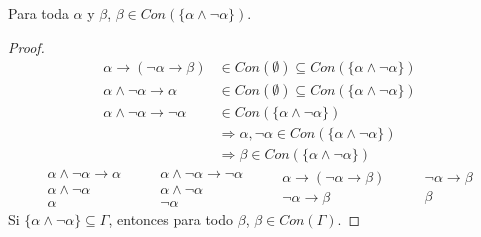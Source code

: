 \begin{prop}
    Para toda $\alpha$ y $\beta$, $\beta\in Con(\{\alpha\land\lnot\alpha\})$.
    \begin{proof}
        \begin{align*}
            \alpha\rightarrow(\lnot\alpha\rightarrow\beta) &\in Con(\emptyset )\subseteq Con(\{\alpha\land\lnot\alpha\})\\
            \alpha\land\lnot\alpha\rightarrow\alpha &\in Con(\emptyset )\subseteq Con(\{\alpha\land\lnot\alpha\}) \\
            \alpha\land \lnot\alpha\rightarrow\lnot\alpha &\in Con(\{\alpha\land\lnot\alpha\})\\
                                                          &\Longrightarrow \alpha,\lnot\alpha\in Con(\{\alpha\land\lnot\alpha\}) \\
                                                          &\Longrightarrow \beta\in Con(\{\alpha\land\lnot\alpha\})
        \end{align*}
        \begin{equation*}
            \begin{array}{c}
                \alpha\land\lnot\alpha\rightarrow\alpha\\
                \alpha\land\lnot\alpha\\
                \hline
                \alpha
            \end{array}\qquad 
            \begin{array}{c}
                \alpha\land\lnot\alpha \rightarrow\lnot\alpha\\
                \alpha\land \lnot\alpha\\
                \hline
                \lnot\alpha
            \end{array}\qquad 
            \begin{array}{c}
                \alpha\rightarrow(\lnot\alpha\rightarrow\beta)\\
                \hline
                \lnot\alpha\rightarrow\beta
            \end{array}\qquad 
            \begin{array}{c}
                \lnot\alpha\rightarrow\beta \\
                \hline
                \beta
            \end{array}
        \end{equation*}
        Si $\{\alpha\land\lnot\alpha\}\subseteq \Gamma$, entonces para todo $\beta$, $\beta\in Con(\Gamma)$.

    \end{proof}

\end{prop}

